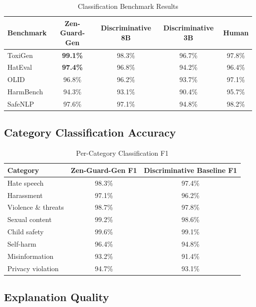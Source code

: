 \documentclass[11pt,a4paper]{article}
\begin{document}
\begin{table}[H]
\centering
\caption{Classification Benchmark Results}
\begin{tabular}{lcccc}
\toprule
\textbf{Benchmark} & \textbf{Zen-Guard-Gen} & \textbf{Discriminative 8B} & \textbf{Discriminative 3B} & \textbf{Human} \\
\midrule
ToxiGen & \textbf{99.1\%} & 98.3\% & 96.7\% & 97.8\% \\
HatEval & \textbf{97.4\%} & 96.8\% & 94.2\% & 96.4\% \\
OLID & 96.8\% & 96.2\% & 93.7\% & 97.1\% \\
HarmBench & 94.3\% & 93.1\% & 90.4\% & 95.7\% \\
SafeNLP & 97.6\% & 97.1\% & 94.8\% & 98.2\% \\
\bottomrule
\end{tabular}
\end{table}

\subsection{Category Classification Accuracy}

\begin{table}[H]
\centering
\caption{Per-Category Classification F1}
\begin{tabular}{lcc}
\toprule
\textbf{Category} & \textbf{Zen-Guard-Gen F1} & \textbf{Discriminative Baseline F1} \\
\midrule
Hate speech & 98.3\% & 97.4\% \\
Harassment & 97.1\% & 96.2\% \\
Violence \& threats & 98.7\% & 97.8\% \\
Sexual content & 99.2\% & 98.6\% \\
Child safety & 99.6\% & 99.1\% \\
Self-harm & 96.4\% & 94.8\% \\
Misinformation & 93.2\% & 91.4\% \\
Privacy violation & 94.7\% & 93.1\% \\
\bottomrule
\end{tabular}
\end{table}

\subsection{Explanation Quality}
\end{document}
